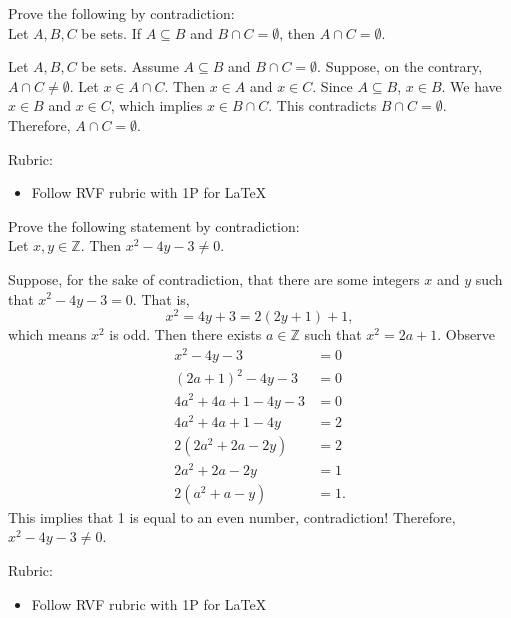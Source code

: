 \documentclass{article}
\newcommand{\Z}{\mathbb{Z}}
\theoremstyle{definition}
\begin{document}
\begin{question}
    Prove the following by contradiction:\\
    Let $A, B, C$ be sets. If $A\subseteq B$ and $B\cap C=\emptyset$, then $A\cap C=\emptyset$.
\end{question}
\begin{solution}
      Let $A, B, C$ be sets. Assume $A\subseteq B$ and $B\cap C=\emptyset$. Suppose, on the contrary, $A\cap C\neq\emptyset$. Let $x\in A\cap C$. Then $x\in A$ and $x\in C$. Since $A\subseteq B$, $x\in B$. We have $x\in B$ and $x\in C$, which implies $x \in B\cap C$. This contradicts $B\cap C=\emptyset$. Therefore, $A\cap C=\emptyset$.
	
{\color{red} Rubric:
\begin{itemize}
\item Follow RVF rubric with 1P for \LaTeX
\end{itemize}}
\end{solution}

\begin{question}
    Prove the following statement by contradiction:\\
    Let $x, y\in \Z$. Then $x^2-4y-3\neq 0$.
\end{question}
\begin{solution}
Suppose, for the sake of contradiction, that there are some integers $x$ and $y$ such that $x^2 - 4y - 3 = 0$. That is,
	\[ x^2 = 4y+3 = 2(2y+1)+1, \]
which means $x^2$ is odd. Then there exists $a\in \Z$ such that $x^2=2a+1$. Observe 
\begin{align*}
x^2 - 4y - 3 & = 0\\
(2a+1)^2 -4y -3 &= 0\\
4a^2+4a+1 -4y -3 & = 0\\
4a^2+4a+1 -4y & = 2\\
2(2a^2+2a - 2y) & = 2\\
2a^2+2a - 2y & = 1\\
2(a^2+a - y) & = 1.
\end{align*}
This implies that 1 is equal to an even number, contradiction! Therefore, $x^2-4y-3\neq 0$.
{\color{red} Rubric:
\begin{itemize}
\item Follow RVF rubric with 1P for \LaTeX
\end{itemize}}
\end{solution}
\end{document}

